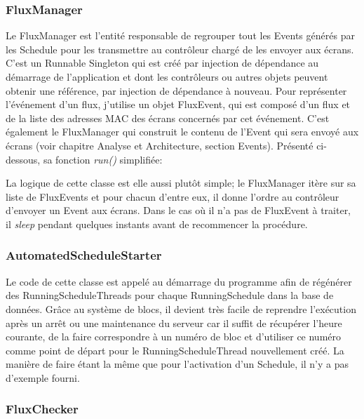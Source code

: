 \documentclass[french]{article}
\begin{document}
\subsubsection{FluxManager}

Le FluxManager est l'entité responsable de regrouper tout les Events générés par les Schedule pour les transmettre au contrôleur chargé de les envoyer aux écrans. C'est un Runnable Singleton qui est créé par injection de dépendance au démarrage de l'application et dont les contrôleurs ou autres objets peuvent obtenir une référence, par injection de dépendance à nouveau.
Pour représenter l'événement d'un flux, j'utilise un objet FluxEvent, qui est composé d'un flux et de la liste des adresses MAC des écrans concernés par cet événement. \newline
C'est également le FluxManager qui construit le contenu de l'Event qui sera envoyé aux écrans (voir chapitre Analyse et Architecture, section Events).
Présenté ci-dessous, sa fonction \textit{run()} simplifiée:



La logique de cette classe est elle aussi plutôt simple; le FluxManager itère sur sa liste de FluxEvents et pour chacun d'entre eux, il donne l'ordre au contrôleur d'envoyer un Event aux écrans. Dans le cas où il n'a pas de FluxEvent à traiter, il \textit{sleep} pendant quelques instants avant de recommencer la procédure.

\subsubsection{AutomatedScheduleStarter}

Le code de cette classe est appelé au démarrage du programme afin de régénérer des RunningScheduleThreads pour chaque RunningSchedule dans la base de données. Grâce au système de blocs, il devient très facile de reprendre l'exécution après un arrêt ou une maintenance du serveur car il suffit de récupérer l'heure courante, de la faire correspondre à un numéro de bloc et d'utiliser ce numéro comme point de départ pour le RunningScheduleThread nouvellement créé. La manière de faire étant la même que pour l'activation d'un Schedule, il n'y a pas d'exemple fourni.

\newpage
\subsubsection{FluxChecker}
\end{document}
